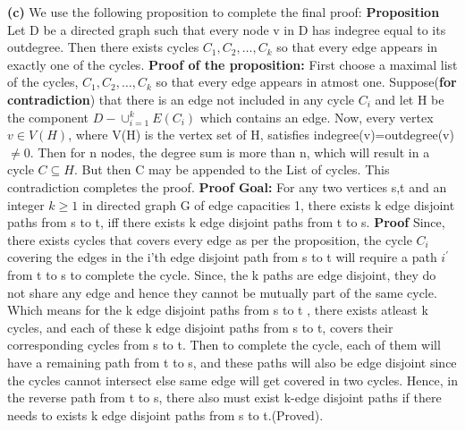 \documentclass{article}
\renewcommand\part[1]{\vspace{.10in}\textbf{(#1)}}
\begin{document}
   \part{c} We use the following proposition to complete the final proof: \newline
   \textbf {Proposition} Let D be a directed graph such that every node v in D has indegree equal to its outdegree. Then there exists cycles $C_1, C_2, \dots, C_k$ so that every edge appears in exactly one of the cycles. \newline
   \textbf {Proof of the proposition:} First choose a maximal list of the cycles, $C_1,C_2,\dots,C_k$ so that every edge appears in atmost one. Suppose(\textbf {for contradiction}) that there is an edge not included in any cycle $C_i$ and let H be the component $D - \cup_{i=1}^kE(C_i)$ which contains an edge. Now, every vertex $v \in V(H)$, where V(H) is the vertex set of H, satisfies indegree(v)=outdegree(v)$\neq 0$. Then for n nodes, the degree sum is more than n, which will result in a cycle $C \subseteq H$. But then C may be appended to the List of cycles. This contradiction completes the proof. \newline
   \textbf {Proof Goal: } For any two vertices s,t and an integer $k \geq 1$ in directed graph G of edge capacities 1, there exists k edge disjoint paths from s to t, iff there exists k edge disjoint paths from t to s. \newline
   \textbf {Proof} Since, there exists cycles that covers every edge as per the proposition, the cycle $C_i$ covering the edges in the i'th edge disjoint path from s to t will require a path $i^\prime$ from t to s to complete the cycle. Since, the k paths are edge disjoint, they do not share any edge and hence they cannot be mutually part of the same cycle. Which means for the k edge disjoint paths from s to t , there exists atleast k cycles, and each of these k edge disjoint paths from s to t, covers their corresponding cycles from s to t. Then to complete the cycle, each of them will have a remaining path from t to s, and these paths will also be edge disjoint since the cycles cannot intersect else same edge will get covered in two cycles. Hence, in the reverse path from t to s, there also must exist k-edge disjoint paths if there needs to exists k edge disjoint paths from s to t.(Proved). \newline
\end{document}
